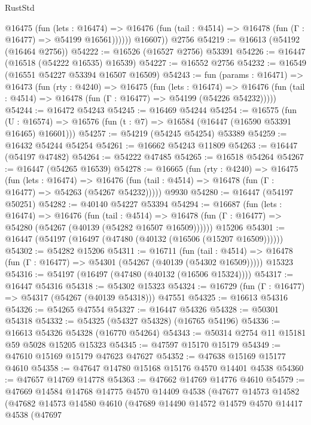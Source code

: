 \begin{lexlean}{RustStd}
\begin{coremodule}
            @16475
              (fun (lets : @16474) =>
              @16476 (fun (tail : @4514) => @16478 (fun (Γ : @16477) => @54199 @16561))))))
        @16607))
    @2756
@54219 := @16613 (@54192 (@16464 @2756))
@54222 := @16526 (@16527 @2756) @53391
@54226 := @16447 (@16518 (@54222 @16535) @16539)
@54227 := @16552 @2756
@54232 := @16549 (@16551 @54227 @53394 @16507 @16509)
@54243 := fun (params : @16471) =>
  @16473
    (fun (rty : @4240) =>
    @16475
      (fun (lets : @16474) =>
      @16476 (fun (tail : @4514) => @16478 (fun (Γ : @16477) => @54199 (@54226 @54232)))))
@54244 := @16472 @54243
@54245 := @16469 @54244
@54254 := @16575
    (fun (U : @16574) => @16576 (fun (t : @7) => @16584 (@16447 (@16590 @53391 @16465) @16601)))
@54257 := @54219 (@54245 @54254) @53389
@54259 := @16432 @54244 @54254
@54261 := @16662 @54243 @11809
@54263 := @16447 (@54197 @47482)
@54264 := @54222 @47485
@54265 := @16518 @54264
@54267 := @16447 (@54265 @16539)
@54278 := @16665
    (fun (rty : @4240) =>
    @16475
      (fun (lets : @16474) =>
      @16476 (fun (tail : @4514) => @16478 (fun (Γ : @16477) => @54263 (@54267 @54232)))))
    @9930
@54280 := @16447 (@54197 @50251)
@54282 := @40140 @54227 @53394
@54294 := @16687
    (fun (lets : @16474) =>
    @16476
      (fun (tail : @4514) =>
      @16478 (fun (Γ : @16477) => @54280 (@54267 (@40139 (@54282 @16507 @16509))))))
    @15206
@54301 := @16447 (@54197 (@16497 (@47480 (@40132 (@16506 (@15207 @16509))))))
@54302 := @54282 @15206
@54311 := @16711
    (fun (tail : @4514) => @16478 (fun (Γ : @16477) => @54301 (@54267 (@40139 (@54302 @16509)))))
    @15323
@54316 := @54197 (@16497 (@47480 (@40132 (@16506 @15324))))
@54317 := @16447 @54316
@54318 := @54302 @15323
@54324 := @16729 (fun (Γ : @16477) => @54317 (@54267 (@40139 @54318))) @47551
@54325 := @16613 @54316
@54326 := @54265 @47554
@54327 := @16447 @54326
@54328 := @50301 @54318
@54332 := @54325 (@54327 @54328) (@16765 @54196)
@54336 := @16613 @54326 @54328 (@16770 @54264)
@54343 := @50314 @2754 @11 @15181 @59 @5028 @15205 @15323
@54345 := @47597 @15170 @15179
@54349 := @47610 @15169 @15179 @47623 @47627
@54352 := @47638 @15169 @15177 @4610
@54358 := @47647 @14780 @15168 @15176 @4570 @14401 @4538
@54360 := @47657 @14769 @14778
@54363 := @47662 @14769 @14776 @4610
@54579 := @47669
    @14584
    @14768
    @14775
    @4570
    @14409
    @4538
    (@47677
      @14573
      @14582
      (@47682
        @14573
        @14580
        @4610
        (@47689
          @14490
          @14572
          @14579
          @4570
          @14417
          @4538
          (@47697

\end{coremodule}
\end{lexlean}
